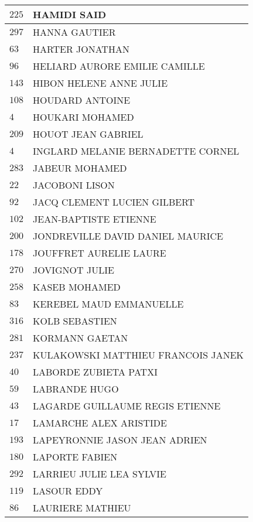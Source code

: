 \begin{xltabular}{\linewidth}{|l|X|}
    \hline
    $225$ & HAMIDI SAID \\
    \hline
    $297$ & HANNA GAUTIER \\
    \hline
    $63$ & HARTER JONATHAN \\
    \hline
    $96$ & HELIARD AURORE EMILIE CAMILLE \\
    \hline
    $143$ & HIBON HELENE ANNE JULIE \\
    \hline
    $108$ & HOUDARD ANTOINE \\
    \hline
    $4$ & HOUKARI MOHAMED \\
    \hline
    $209$ & HOUOT JEAN GABRIEL \\
    \hline
    $4$ & INGLARD MELANIE BERNADETTE CORNEL \\
    \hline
    $283$ & JABEUR MOHAMED \\
    \hline
    $22$ & JACOBONI LISON \\
    \hline
    $92$ & JACQ CLEMENT LUCIEN GILBERT \\
    \hline
    $102$ & JEAN-BAPTISTE ETIENNE \\
    \hline
    $200$ & JONDREVILLE DAVID DANIEL MAURICE \\
    \hline
    $178$ & JOUFFRET AURELIE LAURE \\
    \hline
    $270$ & JOVIGNOT JULIE \\
    \hline
    $258$ & KASEB MOHAMED \\
    \hline
    $83$ & KEREBEL MAUD EMMANUELLE \\
    \hline
    $316$ & KOLB SEBASTIEN \\
    \hline
    $281$ & KORMANN GAETAN \\
    \hline
    $237$ & KULAKOWSKI MATTHIEU FRANCOIS JANEK \\
    \hline
    $40$ & LABORDE ZUBIETA PATXI \\
    \hline
    $59$ & LABRANDE HUGO \\
    \hline
    $43$ & LAGARDE GUILLAUME REGIS ETIENNE \\
    \hline
    $17$ & LAMARCHE ALEX ARISTIDE \\
    \hline
    $193$ & LAPEYRONNIE JASON JEAN ADRIEN \\
    \hline
    $180$ & LAPORTE FABIEN \\
    \hline
    $292$ & LARRIEU JULIE LEA SYLVIE \\
    \hline
    $119$ & LASOUR EDDY \\
    \hline
    $86$ & LAURIERE MATHIEU \\
    \hline

\end{xltabular}

